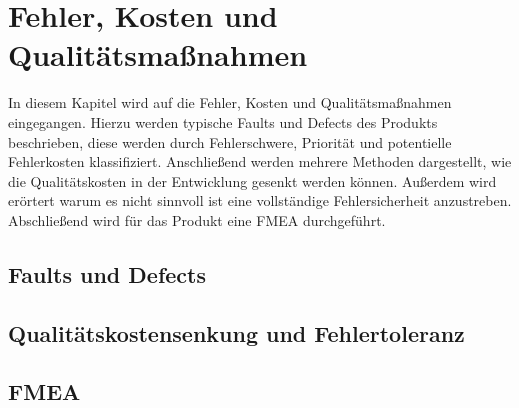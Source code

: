 \section{Fehler, Kosten und Qualitätsmaßnahmen}

In diesem Kapitel wird auf die Fehler, Kosten und Qualitätsmaßnahmen eingegangen.
Hierzu werden typische Faults und Defects des Produkts beschrieben, diese werden durch Fehlerschwere, Priorität und potentielle Fehlerkosten klassifiziert. 
Anschließend werden mehrere Methoden dargestellt, wie die Qualitätskosten in der Entwicklung gesenkt werden können.
Außerdem wird erörtert warum es nicht sinnvoll ist eine vollständige Fehlersicherheit anzustreben.
Abschließend wird für das Produkt eine \ac{FMEA} durchgeführt.

\subsection{Faults und Defects}





\subsection{Qualitätskostensenkung und Fehlertoleranz}






\subsection{\acl{FMEA}}





